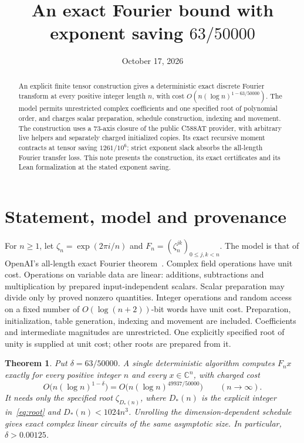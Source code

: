 \documentclass[11pt]{amsart}
\title[An exact Fourier bound]{An exact Fourier bound with exponent saving $63/50000$}
\date{October 17, 2026}
\newtheorem{theorem}{Theorem}[section]
\theoremstyle{remark}
\newcommand{\C}{\mathbb C}
\begin{document}
\begin{abstract}
An explicit finite tensor construction gives a deterministic exact discrete
Fourier transform at every positive integer length $n$, with cost
$O(n(\log n)^{1-63/50000})$. The model permits unrestricted complex
coefficients and one specified root of polynomial order, and charges scalar
preparation, schedule construction, indexing and movement. The construction
uses a 73-axis closure of the public C588AT provider, with arbitrary live
helpers and separately charged initialized copies. Its exact recursive
moment contracts at tensor saving $1261/10^6$; strict exponent slack absorbs
the all-length Fourier transfer loss. This note presents the construction, its exact certificates and its Lean
formalization at the stated exponent saving.
\end{abstract}
\maketitle

\section{Statement, model and provenance}
For $n\ge1$, let $\zeta_n=\exp(2\pi i/n)$ and
$F_n=(\zeta_n^{jk})_{0\le j,k<n}$. The model is that of OpenAI's
all-length exact Fourier theorem~\cite{OpenAIExactDFT2026}. Complex field
operations have unit cost. Operations on variable data are linear:
additions, subtractions and multiplication by prepared input-independent
scalars. Scalar preparation may divide only by proved nonzero quantities.
Integer operations and random access on a fixed number of
$O(\log(n+2))$-bit words have unit cost. Preparation, initialization,
table generation, indexing and movement are included. Coefficients and
intermediate magnitudes are unrestricted. One explicitly specified root
of unity is supplied at unit cost; other roots are prepared from it.

\begin{theorem}\label{thm:main}
Put $\delta=63/50000$. A single deterministic algorithm computes $F_nx$
exactly for every positive integer $n$ and every $x\in\C^n$, with charged
cost
\[
 O\bigl(n(\log n)^{1-\delta}\bigr)
 =O\bigl(n(\log n)^{49937/50000}\bigr)\qquad(n\longrightarrow\infty).
\]
It needs only the specified root $\zeta_{D_*(n)}$, where $D_*(n)$ is the
explicit integer in~\eqref{eq:root} and $D_*(n)<1024n^3$.
Unrolling the dimension-dependent schedule gives exact complex linear
circuits of the same asymptotic size. In particular, $\delta>0.00125$.
\end{theorem}
\end{document}
